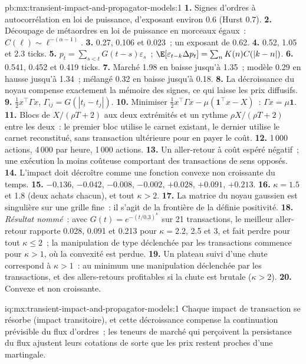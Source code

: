 \begin{solution}{pb:mx:transient-impact-and-propagator-models:1}
\textbf{1.} Signes d'ordres à autocorrélation en loi de puissance, d'exposant environ 0.6 (Hurst 0.7).
\textbf{2.} Découpage de métaordres en loi de puissance en morceaux égaux~: $C(\ell)\sim\ell^{-(\alpha-1)}$.
\textbf{3.} 0.27, 0.106 et 0.023~; un exposant de 0.62.
\textbf{4.} 0.52, 1.05 et 2.3 ticks.
\textbf{5.} $p_t=\sum_{s<t}G(t-s)\varepsilon_s$~; $\E[\varepsilon_{t-k}\Delta p_t]=\sum_nK(n)C(|k-n|)$.
\textbf{6.} 0.541, 0.452 et 0.419 ticks.
\textbf{7.} Marché 1.98 en baisse jusqu'à 1.35~; modèle 0.29 en hausse jusqu'à 1.34~; mélangé 0.32 en baisse jusqu'à 0.18.
\textbf{8.} La décroissance du noyau compense exactement la mémoire des signes, ce qui laisse les prix diffusifs.
\textbf{9.} $\tfrac12x^\top\Gamma x$, $\Gamma_{ij}=G(|t_i-t_j|)$.
\textbf{10.} Minimiser $\tfrac12x^\top\Gamma x-\mu(\mathbf 1^\top x-X)$~: $\Gamma x=\mu\mathbf 1$.
\textbf{11.} Blocs de $X/(\rho T+2)$ aux deux extrémités et un rythme $\rho X/(\rho T+2)$ entre les deux~: le premier bloc utilise le carnet existant, le dernier utilise le carnet
reconstitué, sans transaction ultérieure pour en payer le coût.
\textbf{12.} 1\,000 actions, 4\,000 par heure, 1\,000 actions.
\textbf{13.} Un aller-retour à coût espéré négatif~; une exécution la moins coûteuse comportant des transactions de sens opposés.
\textbf{14.} L'impact doit décroître comme une fonction convexe non croissante du temps.
\textbf{15.} $-0.136$, $-0.042$, $-0.008$, $-0.002$, $+0.028$, $+0.091$, $+0.213$.
\textbf{16.} $\kappa=1.5$ et 1.8 (deux achats chacun), et tout $\kappa>2$.
\textbf{17.} La matrice du noyau gaussien est singulière sur une grille fine~: il s'agit de la frontière de la définie positivité.
\textbf{18.} \emph{Résultat nommé}~: avec $G(t)=e^{-(t/0.3)^\kappa}$ sur 21 transactions, le meilleur aller-retour rapporte 0.028, 0.091 et 0.213 pour $\kappa=2.2$, 2.5 et 3, et
fait perdre pour tout $\kappa\le2$~; la manipulation de type déclenchée par les transactions commence pour $\kappa>1$, où la convexité est perdue.
\textbf{19.} Un plateau suivi d'une chute correspond à $\kappa>1$~: au minimum une manipulation déclenchée par les transactions, et des allers-retours profitables si la chute est brutale ($\kappa>2$).
\textbf{20.} Convexe et non croissante.
\end{solution}

\begin{solution}{iq:mx:transient-impact-and-propagator-models:1}
Chaque impact de transaction se résorbe (impact transitoire), et cette décroissance compense la continuation prévisible du flux d'ordres~; les teneurs de marché qui perçoivent la
persistance du flux ajustent leurs cotations de sorte que les prix restent proches d'une martingale.
\end{solution}

